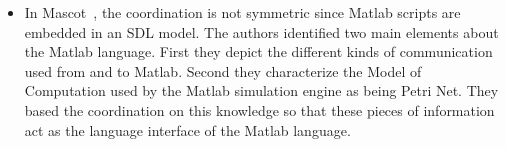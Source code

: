 \begin{itemize}
			\item In Mascot~\cite{mascotbib}, the coordination is not symmetric since Matlab scripts are embedded in an SDL model.  The authors identified two main elements about the Matlab language. First they depict the different kinds of communication used from and to Matlab. Second they characterize the Model of Computation used by the Matlab simulation engine as being Petri Net. They based the coordination on this knowledge so that these pieces of information act as the language interface of the Matlab language. 
		\end{itemize}
